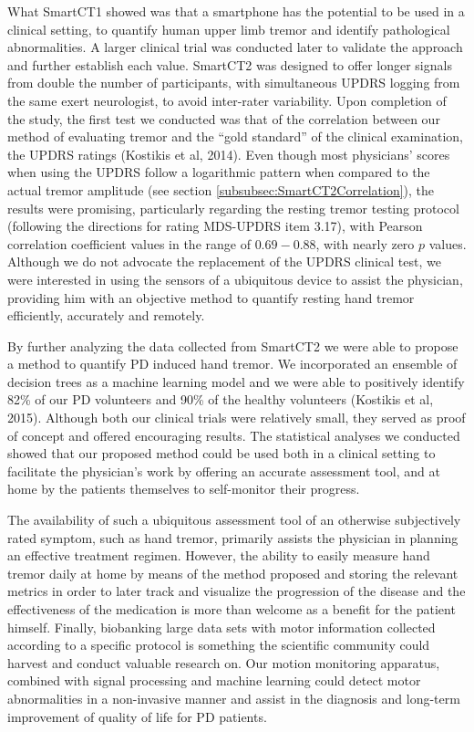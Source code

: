 What \gls{SmartCT1} showed was that a smartphone has the potential to be used in a clinical setting, to quantify human upper limb tremor and identify pathological abnormalities. A larger clinical trial was conducted later to validate the approach and further establish each value. \gls{SmartCT2} was designed to offer longer signals from double the number of participants, with simultaneous \gls{UPDRS} logging from the same exert neurologist, to avoid inter-rater variability. Upon completion of the study, the first test we conducted was that of the correlation between our method of evaluating tremor and the ``gold standard'' of the clinical examination, the \gls{UPDRS} ratings (Kostikis et al, 2014). Even though most physicians' scores when using the \gls{UPDRS} follow a logarithmic pattern when compared to the actual tremor amplitude (see section \ref{subsubsec:SmartCT2Correlation}), the results were promising, particularly regarding the resting tremor testing protocol (following the directions for rating \gls{MDS}-\gls{UPDRS} item 3.17), with Pearson correlation coefficient values in the range of $0.69 - 0.88$, with nearly zero $p$ values. Although we do not advocate the replacement of the \gls{UPDRS} clinical test, we were interested in using the sensors of a ubiquitous device to assist the physician, providing him with an objective method to quantify resting hand tremor efficiently, accurately and remotely. 

By further analyzing the data collected from \gls{SmartCT2} we were able to propose a method to quantify \gls{PD} induced hand tremor. We incorporated an ensemble of decision trees as a machine learning model and we were able to positively identify 82\% of our \gls{PD} volunteers and 90\% of the healthy volunteers (Kostikis et al, 2015). Although both our clinical trials were relatively small, they served as proof of concept and offered encouraging results. The statistical analyses we conducted showed that our proposed method could be used both in a clinical setting to facilitate the physician's work by offering an accurate assessment tool, and at home by the patients themselves to self-monitor their progress. 

The availability of such a ubiquitous assessment tool of an otherwise subjectively rated symptom, such as hand tremor, primarily assists the physician in planning an effective treatment regimen. However, the ability to easily measure hand tremor daily at home by means of the method proposed and storing the relevant metrics in order to later track and visualize the progression of the disease and the effectiveness of the medication is more than welcome as a benefit for the patient himself. Finally, biobanking large data sets with motor information collected according to a specific protocol is something the scientific community could harvest and conduct valuable research on. Our motion monitoring apparatus, combined with signal processing and machine learning could detect motor abnormalities in a non-invasive manner and assist in the diagnosis and long-term improvement of quality of life for PD patients. 

